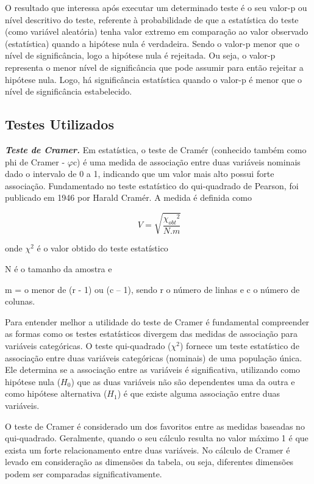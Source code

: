 \documentclass[12pt,fleqn]{article}
\begin{document}
{O resultado que interessa após executar um determinado teste é o seu valor-p ou nível descritivo do teste, referente à probabilidade de que a estatística do teste (como variável aleatória) tenha valor extremo em comparação ao valor observado (estatística) quando a hipótese nula é verdadeira. Sendo o valor-p menor que o nível de significância, logo a hipótese nula é rejeitada. Ou seja, o valor-p representa o menor nível de significância que pode assumir para então rejeitar a hipótese nula. Logo, há significância estatística quando o valor-p é menor que o nível de significância estabelecido.

\subsection{Testes Utilizados}

\vspace{0.5cm}
\textbf{\textit{Teste de Cramer.}} Em estatística, o teste de Cramér (conhecido também como phi de Cramer - $\varphi$c) é uma medida de associação entre duas variáveis nominais dado o intervalo de 0 a 1, indicando que um valor mais alto possui forte associação. Fundamentado no teste estatístico do qui-quadrado de Pearson, foi publicado em 1946 por Harald Cramér. A medida é definida como 

\begin{equation}
\ V = \sqrt{\frac{{\chi_{obt}}^2}{N.m}}
\label{eq:eq1}
\end{equation}
	
	onde $\chi^2$ é o valor obtido do teste estatístico
	
	N é o tamanho da amostra e 
    
    m = o menor de (r - 1) ou (c – 1), sendo r o número de linhas e c o número de colunas.

Para entender melhor a utilidade do teste de Cramer é fundamental compreender as formas como os testes estatísticos divergem das medidas de associação para variáveis categóricas. O teste qui-quadrado ($\chi^2$) fornece um teste estatístico de associação entre duas variáveis categóricas (nominais) de uma população única. Ele determina se a associação entre as variáveis é significativa, utilizando como hipótese nula ($H_0$) que as duas variáveis não são dependentes uma da outra e como hipótese alternativa ($H_1$) é que existe alguma associação entre duas variáveis.

O teste de Cramer é considerado um dos favoritos entre as medidas baseadas no qui-quadrado. Geralmente, quando o seu cálculo resulta no valor máximo 1 é que exista um forte relacionamento entre duas variáveis. No cálculo de Cramer é levado em consideração as dimensões da tabela, ou seja, diferentes dimensões podem ser comparadas significativamente.

}
\end{document}
